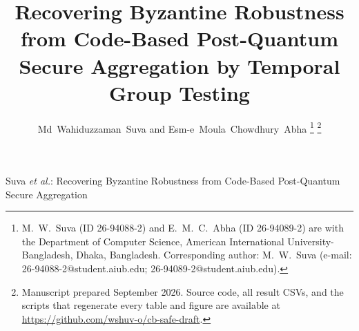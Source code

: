 \documentclass[lettersize,journal]{IEEEtran}
\begin{document}
\title{Recovering Byzantine Robustness from Code-Based Post-Quantum Secure
Aggregation by Temporal Group Testing}

\author{Md~Wahiduzzaman~Suva and Esm-e~Moula~Chowdhury~Abha%
\thanks{M.~W.~Suva (ID 26-94088-2) and E.~M.~C.~Abha (ID 26-94089-2) are with the
Department of Computer Science, American International University-Bangladesh,
Dhaka, Bangladesh. Corresponding author: M.~W.~Suva
(e-mail: 26-94088-2@student.aiub.edu; 26-94089-2@student.aiub.edu).}%
\thanks{Manuscript prepared September 2026. Source code, all result CSVs, and the
scripts that regenerate every table and figure are available at
\url{https://github.com/wshuv-o/cb-safe-draft}.}}

%
{Suva \MakeLowercase{\textit{et al.}}: Recovering Byzantine Robustness from Code-Based Post-Quantum Secure Aggregation}

\maketitle
\end{document}
